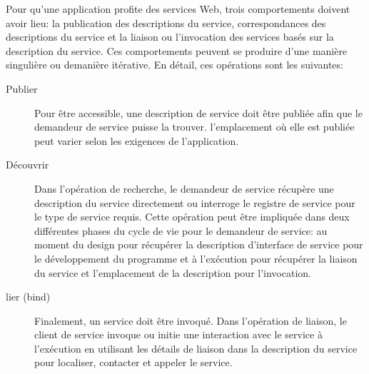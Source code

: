   Pour qu'une application profite des services Web, trois
  comportements doivent avoir lieu: la publication des descriptions
  du service, correspondances des descriptions du service et la
  liaison ou l'invocation des services basés sur la description du
  service. Ces comportements peuvent se produire d'une manière
  singulière ou demanière itérative. En détail, ces opérations sont
  les suivantes:

  \SpecialItem
  \begin{description}%
    \item[Publier] Pour être accessible, une description de service
      doit être publiée afin que le demandeur de service puisse la
      trouver. l'emplacement où elle est publiée peut varier selon les
      exigences de l'application.

    \item[Découvrir]
      Dans l'opération de recherche, le demandeur de service récupère
      une description du service directement ou interroge le registre
      de service pour le type de service requis. Cette opération peut
      être impliquée dans deux différentes phases du cycle de vie pour
      le demandeur de service: au moment du design pour récupérer la
      description d'interface de service pour le développement du
      programme et à l'exécution pour récupérer la liaison du service
      et l'emplacement de la description pour l'invocation.

    \item[lier (bind)] Finalement, un service doit être invoqué. Dans
      l'opération de liaison, le client de service invoque ou initie
      une interaction avec le service à l'exécution en utilisant les
      détails de liaison dans la description du service pour
      localiser, contacter et appeler le service.
  \end{description}

